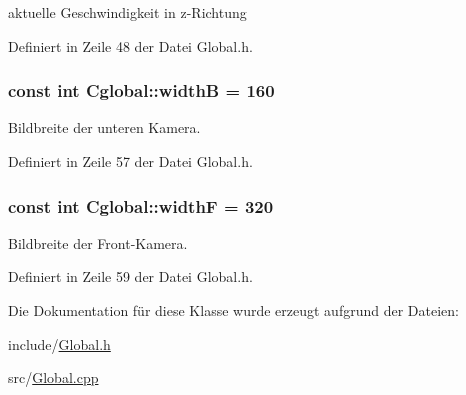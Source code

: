 aktuelle Geschwindigkeit in z-\/Richtung 



Definiert in Zeile 48 der Datei Global.h.

\hypertarget{class_cglobal_a931ff0dc06e16b267d22dd21570d686b}{
\subsubsection[{widthB}]{\setlength{\rightskip}{0pt plus 5cm}const int {\bf Cglobal::widthB} = 160}}
\label{class_cglobal_a931ff0dc06e16b267d22dd21570d686b}


Bildbreite der unteren Kamera. 



Definiert in Zeile 57 der Datei Global.h.

\hypertarget{class_cglobal_a95cebf066839488c61b4bc2f7fbf61c1}{
\subsubsection[{widthF}]{\setlength{\rightskip}{0pt plus 5cm}const int {\bf Cglobal::widthF} = 320}}
\label{class_cglobal_a95cebf066839488c61b4bc2f7fbf61c1}


Bildbreite der Front-\/Kamera. 



Definiert in Zeile 59 der Datei Global.h.



Die Dokumentation für diese Klasse wurde erzeugt aufgrund der Dateien:\begin{DoxyCompactItemize}
\item 
include/\hyperlink{_global_8h}{Global.h}\item 
src/\hyperlink{_global_8cpp}{Global.cpp}\end{DoxyCompactItemize}
